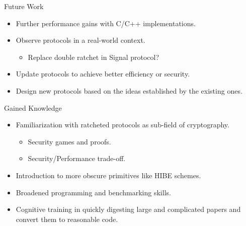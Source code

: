 \documentclass{beamer}
\begin{document}
\begin{frame}{Future Work}
  \begin{itemize}
  \item Further performance gains with C/C++ implementations.
  \item Observe protocols in a real-world context.
    \begin{itemize}
    \item Replace double ratchet in Signal protocol?
    \end{itemize}
  \item Update protocols to achieve better efficiency or security.
  \item Design new protocols based on the ideas established by the existing ones.
  \end{itemize}
\end{frame}

\begin{frame}{Gained Knowledge}
  \begin{itemize}
  \item Familiarization with ratcheted protocols as sub-field of cryptography.
    \begin{itemize}
    \item Security games and proofs.
    \item Security/Performance trade-off.
    \end{itemize}
  \item Introduction to more obscure primitives like HIBE schemes.
  \item Broadened programming and benchmarking skills.
  \item Cognitive training in quickly digesting large and complicated
    papers and convert them to reasonable code.
  \end{itemize}
\end{frame}
\end{document}
